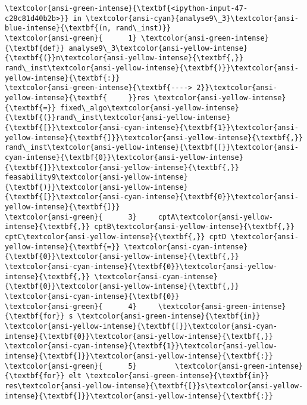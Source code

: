 \documentclass[11pt]{article}
\begin{document}
\begin{Verbatim}[commandchars=\\\{\}, frame=single, framerule=2mm, rulecolor=\color{outerrorbackground}]
\textcolor{ansi-green-intense}{\textbf{<ipython-input-47-c28c81d40b2b>}} in \textcolor{ansi-cyan}{analyse9\_3}\textcolor{ansi-blue-intense}{\textbf{(n, rand\_inst)}}
\textcolor{ansi-green}{      1} \textcolor{ansi-green-intense}{\textbf{def}} analyse9\_3\textcolor{ansi-yellow-intense}{\textbf{(}}n\textcolor{ansi-yellow-intense}{\textbf{,}} rand\_inst\textcolor{ansi-yellow-intense}{\textbf{)}}\textcolor{ansi-yellow-intense}{\textbf{:}}
\textcolor{ansi-green-intense}{\textbf{----> 2}}\textcolor{ansi-yellow-intense}{\textbf{     }}res \textcolor{ansi-yellow-intense}{\textbf{=}} fixed\_algo\textcolor{ansi-yellow-intense}{\textbf{(}}rand\_inst\textcolor{ansi-yellow-intense}{\textbf{[}}\textcolor{ansi-cyan-intense}{\textbf{1}}\textcolor{ansi-yellow-intense}{\textbf{]}}\textcolor{ansi-yellow-intense}{\textbf{,}} rand\_inst\textcolor{ansi-yellow-intense}{\textbf{[}}\textcolor{ansi-cyan-intense}{\textbf{0}}\textcolor{ansi-yellow-intense}{\textbf{]}}\textcolor{ansi-yellow-intense}{\textbf{,}} feasability9\textcolor{ansi-yellow-intense}{\textbf{)}}\textcolor{ansi-yellow-intense}{\textbf{[}}\textcolor{ansi-cyan-intense}{\textbf{0}}\textcolor{ansi-yellow-intense}{\textbf{]}}
\textcolor{ansi-green}{      3}     cptA\textcolor{ansi-yellow-intense}{\textbf{,}} cptB\textcolor{ansi-yellow-intense}{\textbf{,}} cptC\textcolor{ansi-yellow-intense}{\textbf{,}} cptD \textcolor{ansi-yellow-intense}{\textbf{=}} \textcolor{ansi-cyan-intense}{\textbf{0}}\textcolor{ansi-yellow-intense}{\textbf{,}} \textcolor{ansi-cyan-intense}{\textbf{0}}\textcolor{ansi-yellow-intense}{\textbf{,}} \textcolor{ansi-cyan-intense}{\textbf{0}}\textcolor{ansi-yellow-intense}{\textbf{,}} \textcolor{ansi-cyan-intense}{\textbf{0}}
\textcolor{ansi-green}{      4}     \textcolor{ansi-green-intense}{\textbf{for}} s \textcolor{ansi-green-intense}{\textbf{in}} \textcolor{ansi-yellow-intense}{\textbf{[}}\textcolor{ansi-cyan-intense}{\textbf{0}}\textcolor{ansi-yellow-intense}{\textbf{,}} \textcolor{ansi-cyan-intense}{\textbf{1}}\textcolor{ansi-yellow-intense}{\textbf{]}}\textcolor{ansi-yellow-intense}{\textbf{:}}
\textcolor{ansi-green}{      5}         \textcolor{ansi-green-intense}{\textbf{for}} elt \textcolor{ansi-green-intense}{\textbf{in}} res\textcolor{ansi-yellow-intense}{\textbf{[}}s\textcolor{ansi-yellow-intense}{\textbf{]}}\textcolor{ansi-yellow-intense}{\textbf{:}}


\end{Verbatim}
\end{document}
